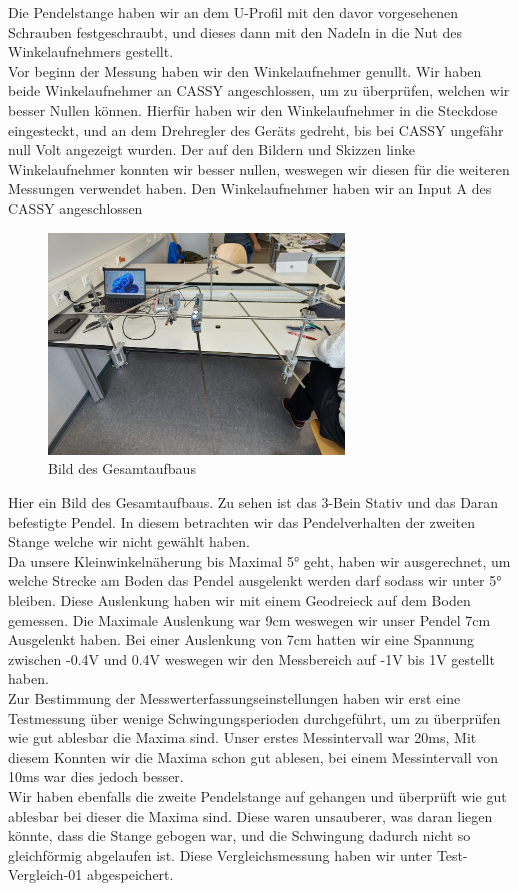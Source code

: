 \documentclass[twoside]{protokoll}
\begin{document}
Die Pendelstange haben wir an dem U-Profil mit den davor vorgesehenen Schrauben festgeschraubt, und dieses dann mit den Nadeln in die Nut des Winkelaufnehmers gestellt.\\
Vor beginn der Messung haben wir den Winkelaufnehmer genullt. 
Wir haben beide Winkelaufnehmer an CASSY angeschlossen, um zu überprüfen, welchen wir besser Nullen können.
Hierfür haben wir den Winkelaufnehmer in die Steckdose eingesteckt, und an dem Drehregler des Geräts gedreht, bis bei CASSY ungefähr null Volt angezeigt wurden.
Der auf den Bildern und Skizzen linke Winkelaufnehmer konnten wir besser nullen, weswegen wir diesen für die weiteren Messungen verwendet haben.
Den Winkelaufnehmer haben wir an Input A des CASSY angeschlossen\\
\begin{figure}[H]
    \centering
    \includegraphics[width=0.7\textwidth]{Bilder/gesamtaufbau.pdf}
    \caption{Bild des Gesamtaufbaus}
    \end{figure}
Hier ein Bild des Gesamtaufbaus. Zu sehen ist das 3-Bein Stativ und das Daran befestigte Pendel.
In diesem betrachten wir das Pendelverhalten der zweiten Stange welche wir nicht gewählt haben.\\

Da unsere Kleinwinkelnäherung bis Maximal 5° geht, haben wir ausgerechnet, um welche Strecke am Boden das Pendel ausgelenkt werden darf sodass wir unter 5° bleiben. 
Diese Auslenkung haben wir mit einem Geodreieck auf dem Boden gemessen. 
Die Maximale Auslenkung war 9cm weswegen wir unser Pendel 7cm Ausgelenkt haben.
Bei einer Auslenkung von 7cm hatten wir eine Spannung zwischen -0.4V und 0.4V weswegen wir den Messbereich auf -1V bis 1V gestellt haben.\\

Zur Bestimmung der Messwerterfassungseinstellungen haben wir erst eine Testmessung über wenige Schwingungsperioden durchgeführt, um zu überprüfen wie gut ablesbar die Maxima sind.
Unser erstes Messintervall war 20ms, Mit diesem Konnten wir die Maxima schon gut ablesen, bei einem Messintervall von 10ms war dies jedoch besser.\\
Wir haben ebenfalls die zweite Pendelstange auf gehangen und überprüft wie gut ablesbar bei dieser die Maxima sind.
 Diese waren unsauberer, was daran liegen könnte, dass die Stange gebogen war, und die Schwingung dadurch nicht so gleichförmig abgelaufen ist.
 Diese Vergleichsmessung haben wir unter Test-Vergleich-01 abgespeichert. \\
\end{document}
